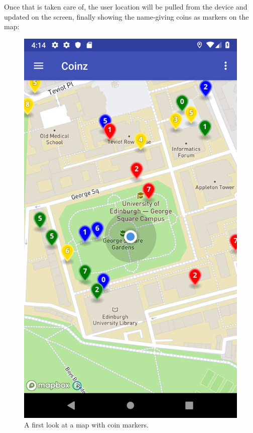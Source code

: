 \documentclass[11pt,a4paper,notitlepage]{article}
\begin{document}
    Once that is taken care of, the user location will be pulled from the device and updated on the screen, finally showing the name-giving coins as markers on the map:

\begin{figure}[H]
    \centering
    \includegraphics[scale=0.25]{screenshots/map/map-with-markers.png}
    \caption{A first look at a map with coin markers.}
\end{figure}
\end{document}
